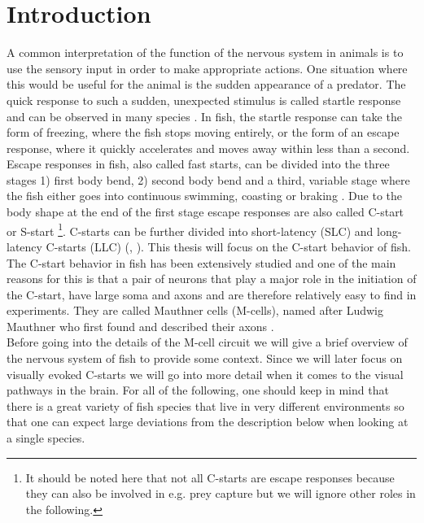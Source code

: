 \chapter{Introduction} %
	A common interpretation of the function of the nervous system in animals is to use the sensory 
	input in order to make appropriate actions.
	One situation where this would be useful for the animal is the sudden appearance of a predator.
	The quick response to such a sudden, unexpected stimulus is called startle response and can be 
	observed in many species \citep{Eaton1984a}.
	In fish, the startle response can take the form of freezing, where the fish	stops moving 
	entirely, or the form of an escape response, where it quickly accelerates and moves away within 
	less than a second.
	Escape responses in fish, also called fast starts, can be divided into the three stages 1) 
	first body bend, 2) second body bend and a third, variable stage where the fish either goes 
	into continuous swimming, coasting or braking \citep{Domenici2011}.
	Due to the body shape at the end of the first stage escape responses are also called C-start or 
	S-start \citep{Domenici2011}\footnote{It should be noted here that not all C-starts are escape 
	responses because they can also be involved in e.g. prey capture but we will ignore other roles 
	in the following.}.
    C-starts can be further divided into short-latency (SLC) and long-latency C-starts (LLC) (\cite{Burgess2007}, \cite{Domenici2010}).
	This thesis will focus on the C-start behavior of fish.\\
	The C-start behavior in fish has been extensively studied and one of the main reasons for this 
	is that a pair of neurons that play a major role in the initiation of the C-start, have large 
	soma and axons and are therefore relatively easy to find in experiments.
	They are called Mauthner cells (M-cells), named after Ludwig Mauthner who first found and 
	described their axons \citep{Mauthner1859}.\\
	Before going into the details of the M-cell circuit we will give a brief overview of the 
	nervous system of fish to provide some context.
	Since we will later focus on visually evoked C-starts we will go into more detail when it comes 
	to the visual pathways in the brain.
    For all of the following, one should keep in mind that there is a great variety of fish species that live in very different environments so that one can expect large deviations from the description below when looking at a single species.\\
